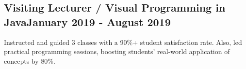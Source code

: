 \subsection{{Visiting Lecturer / Visual Programming in Java\hfill January 2019 - August 2019}}
\begin{zitemize}

\item Instructed and guided 3 classes with a 90\%+ student satisfaction rate. Also, led practical programming sessions, boosting students' real-world application of concepts by 80\%.
    
\end{zitemize}

